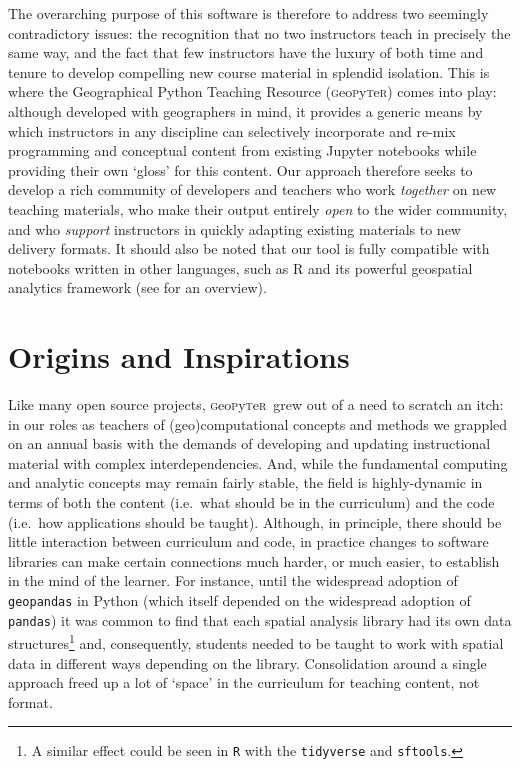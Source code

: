 \documentclass[letter, 11pt,titlepage]{article}
\newcommand{\gp}{\textsc{g}eo\textsc{p}y\textsc{t}e\textsc{r}~\/}
\newcommand{\ie}{i.e.~\/}
\begin{document}
The overarching purpose of this software is therefore to address two seemingly contradictory issues: the recognition that no two instructors teach in precisely the same way, and the fact that few instructors have the luxury of both time and tenure to develop compelling new course material in splendid isolation. This is  where the Geographical Python Teaching Resource (\textsc{g}eo\textsc{p}y\textsc{t}e\textsc{r}) comes into play: although developed with geographers in mind, it provides a generic means by which instructors in any discipline can selectively incorporate and re-mix programming and conceptual content from existing Jupyter notebooks while providing their own `gloss' for this content. Our approach therefore seeks to develop a rich community of developers and teachers who work \emph{together} on new teaching materials, who make their output entirely \emph{open} to the wider community, and who \emph{support} instructors in quickly adapting existing materials to new delivery formats. It should also be noted that our tool is fully compatible with notebooks written in other languages, such as R and its powerful geospatial analytics framework (see \citealp{Bivand:2020aa} for an overview).

\section{Origins and Inspirations}\label{origins-and-inspirations}

Like many open source projects, \gp grew out of a need to scratch an itch: in our roles as teachers of (geo)computational concepts and methods we grappled on an annual basis with the demands of developing and updating instructional material with complex interdependencies. And, while the fundamental computing and analytic concepts may remain fairly stable, the field is highly-dynamic in terms of both the content (\ie what should be in the curriculum) and the code (\ie how applications should be taught). Although, in principle, there should be little interaction between curriculum and code, in practice changes to software libraries can make certain connections much harder, or much easier, to establish in the mind of the learner. For instance, until the widespread adoption of \texttt{geopandas} in Python (which itself depended on the widespread adoption of \texttt{pandas}) it was common to find that each spatial analysis library had its own data structures\footnote{A similar effect could be seen in \texttt{R} with the \texttt{tidyverse} and \texttt{sftools}.} and, consequently, students needed to be taught to work with spatial data in different ways depending on the library. Consolidation around a single approach freed up a lot of `space' in the curriculum for teaching content, not format.
\end{document}
